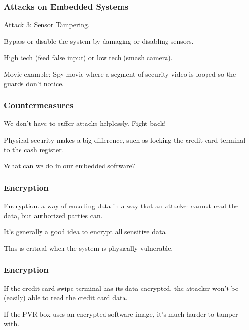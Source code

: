 \begin{frame}
\frametitle{Attacks on Embedded Systems}
\begin{changemargin}{1cm}

Attack 3: Sensor Tampering.

Bypass or disable the system by damaging or disabling sensors.

High tech (feed false input) or low tech (smash camera).

Movie example: Spy movie where a segment of security video is looped so the guards don't notice.

\end{changemargin}
\end{frame}


\begin{frame}
\frametitle{Countermeasures}
\begin{changemargin}{1cm}

We don't have to suffer attacks helplessly. Fight back!

Physical security makes a big difference, such as locking the credit card terminal to the cash register.

What can we do in our embedded software?

\end{changemargin}
\end{frame}

\begin{frame}
\frametitle{Encryption}
\begin{changemargin}{1cm}

\alert{Encryption}: a way of encoding data in a way that an attacker cannot read the data, but authorized parties can. 

It's generally a good idea to encrypt all sensitive data.

This is critical when the system is physically vulnerable.

\end{changemargin}
\end{frame}


\begin{frame}
\frametitle{Encryption}
\begin{changemargin}{1cm}

If the credit card swipe terminal has its data encrypted, the attacker won't be (easily) able to read the credit card data.

If the PVR box uses an encrypted software image, it's much harder to tamper with. 

\end{changemargin}
\end{frame}


